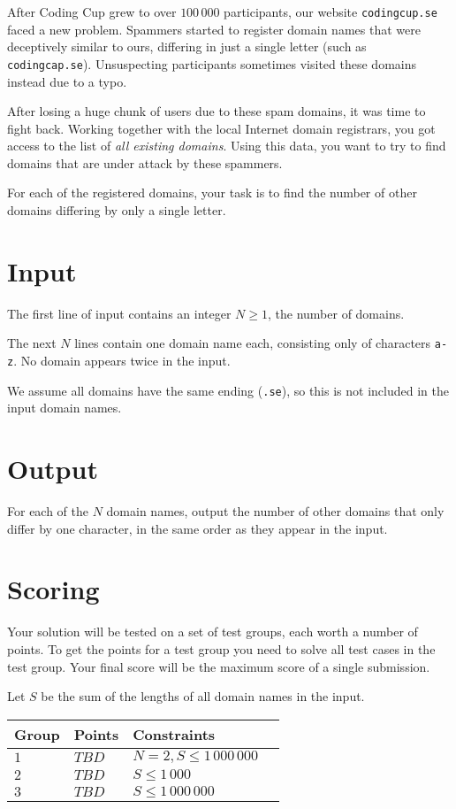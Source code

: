After Coding Cup grew to over $100\,000$ participants, our website \texttt{codingcup.se} faced a new problem.
Spammers started to register domain names that were deceptively similar to ours, differing in just a single letter (such as \texttt{codingcap.se}).
Unsuspecting participants sometimes visited these domains instead due to a typo.

After losing a huge chunk of users due to these spam domains, it was time to fight back.
Working together with the local Internet domain registrars, you got access to the list of \emph{all existing domains}.
Using this data, you want to try to find domains that are under attack by these spammers.

For each of the registered domains, your task is to find the number of other domains differing by only a single letter.

\section*{Input}
The first line of input contains an integer $N \ge 1$, the number of domains.

The next $N$ lines contain one domain name each, consisting only of characters \texttt{a-z}.
No domain appears twice in the input.

We assume all domains have the same ending (\texttt{.se}), so this is not included in the input domain names.

\section*{Output}
For each of the $N$ domain names, output the number of other domains that only differ by one character, in the same order as they appear in the input.

\section*{Scoring}
Your solution will be tested on a set of test groups, each worth a number of points.
To get the points for a test group you need to solve all test cases in the test group.
Your final score will be the maximum score of a single submission.

Let $S$ be the sum of the lengths of all domain names in the input.

\noindent
\begin{tabular}{| l | l | l | l |}
\hline
Group & Points & Constraints \\ \hline
$1$    & $TBD$         & $N = 2, S \le 1\,000\,000$ \\ \hline
$2$    & $TBD$         & $S \le 1\,000$ \\ \hline
$3$    & $TBD$         & $S \le 1\,000\,000$ \\ \hline
\end{tabular}
